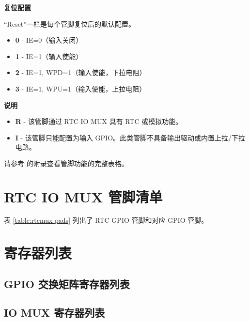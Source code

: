 \documentclass[main\_\_CN.tex]{subfiles}
\begin{document}


\textbf{复位配置}

“Reset”一栏是每个管脚复位后的默认配置。

\begin{itemize}
\item \textbf{0} - IE=0（输入关闭）
\item \textbf{1} - IE=1（输入使能）
\item \textbf{2} - IE=1, WPD=1（输入使能，下拉电阻）
\item \textbf{3} - IE=1, WPU=1（输入使能，上拉电阻）
\end{itemize}

\textbf{说明}

\begin{itemize}
\item \textbf{R} - 该管脚通过 RTC IO MUX 具有 RTC 或模拟功能。
\item \textbf{I} - 该管脚只能配置为输入 GPIO。此类管脚不具备输出驱动或内置上拉/下拉电路。
\end{itemize}

请参考 \doclinkcdCN 的附录查看管脚功能的完整表格。

\section{RTC IO MUX 管脚清单}
\label{sec:rtcmux_pins}

表 \ref{table:rtcmux pads} 列出了 RTC GPIO 管脚和对应 GPIO 管脚。



\hypertarget{iomuxgpio-reg-summ}{}
\section{寄存器列表}
\label{section:4.12}

\subsection{GPIO 交换矩阵寄存器列表}\label{sec:gpio-reg-summ}


\subsection{IO MUX 寄存器列表}\label{sec:iomux-reg-summ}

\end{document}
